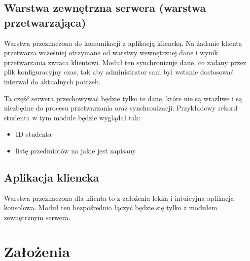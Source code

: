 \par{}

\subsection*[Warstwa zewnętrzna serwera]{Warstwa zewnętrzna serwera (warstwa przetwarzająca)}

\par{Warstwa przeznaczona do komunikacji z aplikacją kliencką. Na żadanie klienta przetwarza wcześniej otrzymane od warstwy wewnętrznej dane i wynik przetwarzania zwraca klientowi. Moduł ten synchronizuje dane, co zadany przez plik konfiguracyjny czas, tak aby administrator sam był wstanie dostosować interwał do aktualnych potrzeb. }

\par{Ta część serwera przechowywać będzie tylko te dane, które nie są wrażliwe i są niezbędne do procesu przetwarzania oraz synchronizacji. Przykładowy rekord studenta w tym module będzie wyglądał tak: }

\begin{itemize}
\item ID studenta
\item listę przedmiotów na jakie jest zapisany
\end{itemize}

\subsection*[Aplikacja kliencka]{Aplikacja kliencka}

\par{Warstwa przeznaczona dla klienta to z założenia lekka i  intuicyjna aplikacja konsolowa. Moduł ten bezpośrednio łączyć będzie się tylko z modułem zewnętrznym serwera.}

\section[Założenia]{Założenia} \label{sec:zalozenia}

